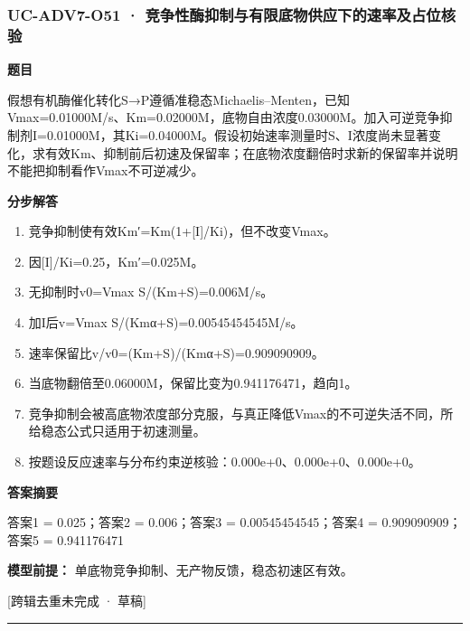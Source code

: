 \documentclass[UTF8,11pt,a4paper]{ctexart}
\begin{document}
\subsubsection*{UC-ADV7-O51 · 竞争性酶抑制与有限底物供应下的速率及占位核验}
\noindent\textbf{题目}\par
假想有机酶催化转化S→P遵循准稳态Michaelis–Menten，已知Vmax=0.01000M/s、Km=0.02000M，底物自由浓度0.03000M。加入可逆竞争抑制剂I=0.01000M，其Ki=0.04000M。假设初始速率测量时S、I浓度尚未显著变化，求有效Km、抑制前后初速及保留率；在底物浓度翻倍时求新的保留率并说明不能把抑制看作Vmax不可逆减少。\par
\medskip\noindent\textbf{分步解答}
\begin{enumerate}
\item 竞争抑制使有效Km′=Km(1+[I]/Ki)，但不改变Vmax。
\item 因[I]/Ki=0.25，Km′=0.025M。
\item 无抑制时v0=Vmax S/(Km+S)=0.006M/s。
\item 加I后v=Vmax S/(Kmα+S)=0.00545454545M/s。
\item 速率保留比v/v0=(Km+S)/(Kmα+S)=0.909090909。
\item 当底物翻倍至0.06000M，保留比变为0.941176471，趋向1。
\item 竞争抑制会被高底物浓度部分克服，与真正降低Vmax的不可逆失活不同，所给稳态公式只适用于初速测量。
\item 按题设反应速率与分布约束逆核验：0.000e+0、0.000e+0、0.000e+0。
\end{enumerate}
\noindent\textbf{答案摘要}\par
答案1 = 0.025；答案2 = 0.006；答案3 = 0.00545454545；答案4 = 0.909090909；答案5 = 0.941176471\par
\noindent\textbf{模型前提：}
单底物竞争抑制、无产物反馈，稳态初速区有效。\par
\noindent\textcolor{red!65!black}{[跨辑去重未完成 · 草稿]} \par
\medskip\hrule\medskip
{}
\end{document}

